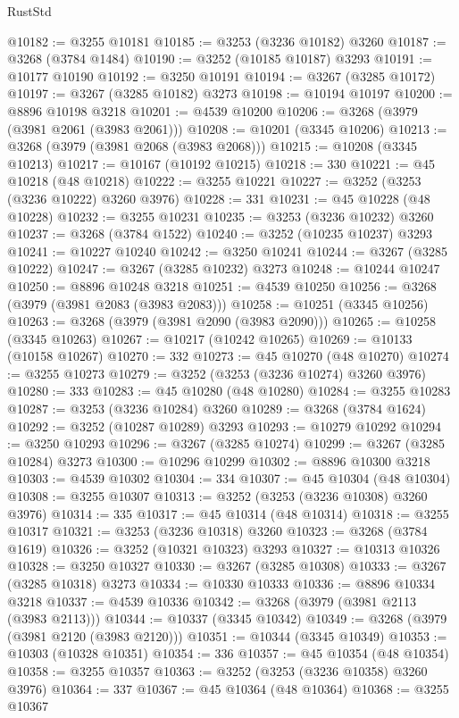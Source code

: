 \begin{lexlean}{RustStd}
\begin{coremodule}
{\begin{coremodule}
{{{{{{{{{{{{{{{{{{{{{{{{{{{{{{{{{{{{{{{@10182 := @3255 @10181
@10185 := @3253 (@3236 @10182) @3260
@10187 := @3268 (@3784 @1484)
@10190 := @3252 (@10185 @10187) @3293
@10191 := @10177 @10190
@10192 := @3250 @10191
@10194 := @3267 (@3285 @10172)
@10197 := @3267 (@3285 @10182) @3273
@10198 := @10194 @10197
@10200 := @8896 @10198 @3218
@10201 := @4539 @10200
@10206 := @3268 (@3979 (@3981 @2061 (@3983 @2061)))
@10208 := @10201 (@3345 @10206)
@10213 := @3268 (@3979 (@3981 @2068 (@3983 @2068)))
@10215 := @10208 (@3345 @10213)
@10217 := @10167 (@10192 @10215)
@10218 := 330
@10221 := @45 @10218 (@48 @10218)
@10222 := @3255 @10221
@10227 := @3252 (@3253 (@3236 @10222) @3260 @3976)
@10228 := 331
@10231 := @45 @10228 (@48 @10228)
@10232 := @3255 @10231
@10235 := @3253 (@3236 @10232) @3260
@10237 := @3268 (@3784 @1522)
@10240 := @3252 (@10235 @10237) @3293
@10241 := @10227 @10240
@10242 := @3250 @10241
@10244 := @3267 (@3285 @10222)
@10247 := @3267 (@3285 @10232) @3273
@10248 := @10244 @10247
@10250 := @8896 @10248 @3218
@10251 := @4539 @10250
@10256 := @3268 (@3979 (@3981 @2083 (@3983 @2083)))
@10258 := @10251 (@3345 @10256)
@10263 := @3268 (@3979 (@3981 @2090 (@3983 @2090)))
@10265 := @10258 (@3345 @10263)
@10267 := @10217 (@10242 @10265)
@10269 := @10133 (@10158 @10267)
@10270 := 332
@10273 := @45 @10270 (@48 @10270)
@10274 := @3255 @10273
@10279 := @3252 (@3253 (@3236 @10274) @3260 @3976)
@10280 := 333
@10283 := @45 @10280 (@48 @10280)
@10284 := @3255 @10283
@10287 := @3253 (@3236 @10284) @3260
@10289 := @3268 (@3784 @1624)
@10292 := @3252 (@10287 @10289) @3293
@10293 := @10279 @10292
@10294 := @3250 @10293
@10296 := @3267 (@3285 @10274)
@10299 := @3267 (@3285 @10284) @3273
@10300 := @10296 @10299
@10302 := @8896 @10300 @3218
@10303 := @4539 @10302
@10304 := 334
@10307 := @45 @10304 (@48 @10304)
@10308 := @3255 @10307
@10313 := @3252 (@3253 (@3236 @10308) @3260 @3976)
@10314 := 335
@10317 := @45 @10314 (@48 @10314)
@10318 := @3255 @10317
@10321 := @3253 (@3236 @10318) @3260
@10323 := @3268 (@3784 @1619)
@10326 := @3252 (@10321 @10323) @3293
@10327 := @10313 @10326
@10328 := @3250 @10327
@10330 := @3267 (@3285 @10308)
@10333 := @3267 (@3285 @10318) @3273
@10334 := @10330 @10333
@10336 := @8896 @10334 @3218
@10337 := @4539 @10336
@10342 := @3268 (@3979 (@3981 @2113 (@3983 @2113)))
@10344 := @10337 (@3345 @10342)
@10349 := @3268 (@3979 (@3981 @2120 (@3983 @2120)))
@10351 := @10344 (@3345 @10349)
@10353 := @10303 (@10328 @10351)
@10354 := 336
@10357 := @45 @10354 (@48 @10354)
@10358 := @3255 @10357
@10363 := @3252 (@3253 (@3236 @10358) @3260 @3976)
@10364 := 337
@10367 := @45 @10364 (@48 @10364)
@10368 := @3255 @10367
}}}}}}}}}}}}}}}}}}}}}}}}}}}}}}}}}}}}}}}
\end{coremodule}}
\end{coremodule}
\end{lexlean}
